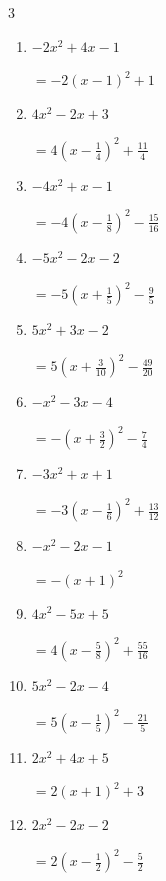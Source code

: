 \begin{multicols}{3}
\begin{enumerate}
  \item $-2x^{2}+4x-1$

        $\displaystyle =-2\left( x-1\right)^{2}+1$

  \item $4x^{2}-2x+3$

        $\displaystyle =4\left( x-\frac{1}{4}\right)^{2}+\frac{11}{4}$

  \item $-4x^{2}+x-1$

        $\displaystyle =-4\left( x-\frac{1}{8}\right)^{2}-\frac{15}{16}$

  \item $-5x^{2}-2x-2$

        $\displaystyle =-5\left( x+\frac{1}{5}\right)^{2}-\frac{9}{5}$

\columnbreak %

  \item $5x^{2}+3x-2$

        $\displaystyle =5\left( x+\frac{3}{10}\right)^{2}-\frac{49}{20}$

  \item $-x^{2}-3x-4$

        $\displaystyle =-\left( x+\frac{3}{2}\right)^{2}-\frac{7}{4}$

  \item $-3x^{2}+x+1$

        $\displaystyle =-3\left( x-\frac{1}{6}\right)^{2}+\frac{13}{12}$

  \item $-x^{2}-2x-1$

        $\displaystyle =-\left( x+1\right)^{2}$

  \item $4x^{2}-5x+5$

        $\displaystyle =4\left( x-\frac{5}{8}\right)^{2}+\frac{55}{16}$

\columnbreak %

  \item $5x^{2}-2x-4$

        $\displaystyle =5\left( x-\frac{1}{5}\right)^{2}-\frac{21}{5}$

  \item $2x^{2}+4x+5$

        $\displaystyle =2\left( x+1\right)^{2}+3$

  \item $2x^{2}-2x-2$

        $\displaystyle =2\left( x-\frac{1}{2}\right)^{2}-\frac{5}{2}$


\end{enumerate}
\end{multicols}
